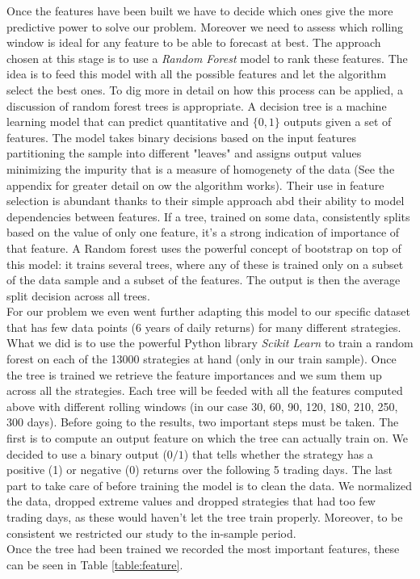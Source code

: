 Once the features have been built we have to decide which ones give the more predictive power to solve our problem. Moreover we need to assess which rolling window is ideal for any feature to be able to forecast at best. The approach chosen at this stage is to use a \textit{Random Forest} model to rank these features. The idea is to feed this model with all the possible features and let the algorithm select the best ones. To dig more in detail on how this process can be applied, a discussion of random forest trees is appropriate. A decision tree is a machine learning model that can predict quantitative and $\{0,1\}$ outputs given a set of features. The model takes binary decisions based on the input features partitioning the sample into different "leaves" and assigns output values minimizing the impurity that is a measure of homogenety of the data (See the appendix for greater detail on ow the algorithm works). Their use in feature selection is abundant thanks to their simple approach abd their ability to model dependencies between features. If a tree, trained on some data, consistently splits based on the value of only one feature, it's a strong indication of importance of that feature. A Random forest uses the powerful concept of bootstrap on top of this model: it trains several trees, where any of these is trained only on a subset of the data sample and a subset of the features. The output is then the average split decision across all trees.\\
For our problem we even went further adapting this model to our specific dataset that has few data points (6 years of daily returns) for many different strategies. What we did is to use the powerful Python library \textit{Scikit Learn} to train a random forest on each of the 13000 strategies at hand (only in our train sample). Once the tree is trained we retrieve the feature importances and we sum them up across all the strategies. Each tree will be feeded with all the features computed above with different rolling windows (in our case 30, 60, 90, 120, 180, 210, 250, 300 days). Before going to the results, two important steps must be taken. The first is to compute an output feature on which the tree can actually train on. We decided to use a binary output ($0/1$) that tells whether the strategy has a positive (1) or negative (0) returns over the following 5 trading days. %
The last part to take care of before training the model is to clean the data. We normalized the data, dropped extreme values and dropped strategies that had too few trading days, as these would haven't let the tree train properly. Moreover, to be consistent we restricted our study to the in-sample period.\\
Once the tree had been trained we recorded the most important features, these can be seen in Table \ref{table:feature}.

